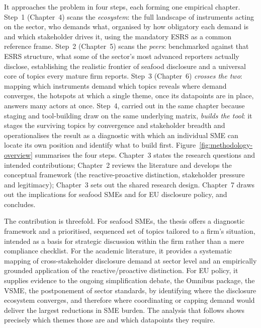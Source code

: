 It approaches the problem in four steps, each forming one empirical chapter.
Step~1 (Chapter~4) scans the \emph{ecosystem}: the full landscape of
instruments acting on the sector, who demands what, organised by how
obligatory each demand is and which stakeholder drives it, using the
mandatory ESRS as a common reference frame. Step~2 (Chapter~5) scans the
\emph{peers}: benchmarked against that ESRS structure, what some of the
sector's most advanced reporters actually disclose, establishing the
realistic frontier of seafood disclosure and a universal core of topics
every mature firm reports. Step~3 (Chapter~6) \emph{crosses the two}: mapping
which instruments demand which topics reveals where demand converges, the
hotspots at which a single theme, once its datapoints are in place, answers
many actors at once. Step~4, carried out in the same chapter because staging
and tool-building draw on the same underlying matrix, \emph{builds the
tool}: it stages the surviving topics by convergence and stakeholder breadth
and operationalises the result as a diagnostic with which an individual SME
can locate its own position and identify what to build first.
Figure~\ref{fig:methodology-overview} summarises the four steps. Chapter~3
states the research questions and intended contributions; Chapter~2 reviews
the literature and develops the conceptual framework (the reactive-proactive
distinction, stakeholder pressure and legitimacy); Chapter~3 sets out the
shared research design. Chapter~7 draws out the implications for seafood
SMEs and for EU disclosure policy, and concludes.

The contribution is threefold. For seafood SMEs, the thesis offers a diagnostic
framework and a prioritised, sequenced set of topics tailored to a firm's
situation, intended as a basis for strategic discussion within the firm rather
than a mere compliance checklist. For the academic literature, it provides a
systematic mapping of cross-stakeholder disclosure demand at sector level and an
empirically grounded application of the reactive/proactive distinction. For EU
policy, it supplies evidence to the ongoing simplification debate, the Omnibus
package, the VSME, the postponement of sector standards, by identifying where
the disclosure ecosystem converges, and therefore where coordinating or capping
demand would deliver the largest reductions in SME burden. The analysis that
follows shows precisely which themes those are and which datapoints they
require.
